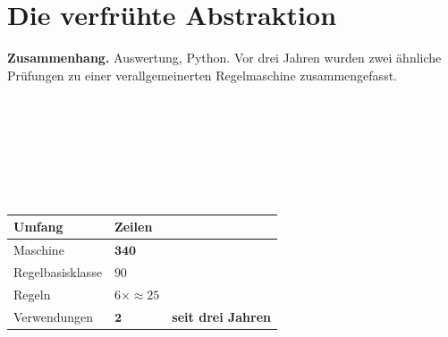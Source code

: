 \chapter{Die verfrühte Abstraktion}\label{fall:abstraktion}

\begin{merksatz}
\textbf{Zusammenhang.} Auswertung, Python. Vor drei Jahren wurden zwei ähnliche Prüfungen zu einer verallgemeinerten Regelmaschine zusammengefasst.

\begin{center}
\begin{minipage}{0.92\textwidth}
\\
\\
\\
\\
\\
\\
\end{minipage}
\end{center}

\begin{center}
\renewcommand{\arraystretch}{1.45}
\begin{tabular}{@{}P{3.0cm}P{2.2cm}P{2.6cm}@{}}
\toprule
\textbf{Umfang} & \textbf{Zeilen} & \\
\midrule
Maschine & $\mathbf{340}$ & \\
Regelbasisklasse & $90$ & \\
Regeln & $6 \times \approx25$ & \\
Verwendungen & $\mathbf{2}$ & \textcolor{akzent}{\textbf{seit drei Jahren}}\\
\bottomrule
\end{tabular}
\end{center}

\begin{center}
\begin{minipage}{0.88\textwidth}
\end{minipage}
\end{center}
\end{merksatz}


